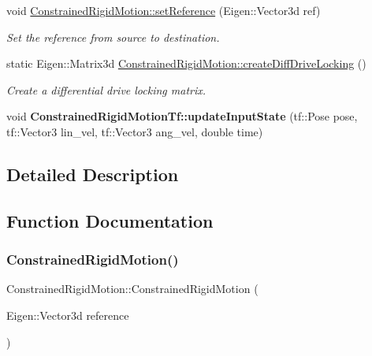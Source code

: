 \begin{DoxyCompactItemize}
void \hyperlink{group__RigidMotion_gac71f6e395c1d63f54cfb837b5526236b}{Constrained\+Rigid\+Motion\+::set\+Reference} (Eigen\+::\+Vector3d ref)
\begin{DoxyCompactList}\small\item\em Set the reference from source to destination. \end{DoxyCompactList}\item 
static Eigen\+::\+Matrix3d \hyperlink{group__RigidMotion_gad4fb6e13815454559ec7e52b291489af}{Constrained\+Rigid\+Motion\+::create\+Diff\+Drive\+Locking} ()
\begin{DoxyCompactList}\small\item\em Create a differential drive locking matrix. \end{DoxyCompactList}\item 
\mbox{\label{group__RigidMotion_gabb5eee0f91ee59d0eda733f8d5769094}} 
void {\bfseries Constrained\+Rigid\+Motion\+Tf\+::update\+Input\+State} (tf\+::\+Pose pose, tf\+::\+Vector3 lin\+\_\+vel, tf\+::\+Vector3 ang\+\_\+vel, double time)
\end{DoxyCompactItemize}


\subsection{Detailed Description}


\subsection{Function Documentation}
\mbox{\label{group__RigidMotion_ga603d9727e46dc49dcf22b24870d15779}} 
\subsubsection{\texorpdfstring{Constrained\+Rigid\+Motion()}{ConstrainedRigidMotion()}}
{\footnotesize\ttfamily Constrained\+Rigid\+Motion\+::\+Constrained\+Rigid\+Motion (\begin{DoxyParamCaption}\item[{Eigen\+::\+Vector3d}]{reference }\end{DoxyParamCaption})}



